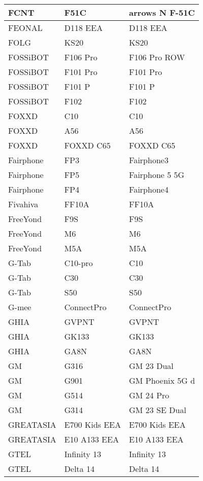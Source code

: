 \begin{tabularx}{\linewidth}{|l|X|X|}
        FCNT & F51C & arrows N F-51C \\ \hline
        FEONAL & D118 EEA & D118 EEA \\ \hline
        FOLG & KS20 & KS20 \\ \hline
        FOSSiBOT & F106 Pro & F106 Pro ROW \\ \hline
        FOSSiBOT & F101 Pro & F101 Pro \\ \hline
        FOSSiBOT & F101 P & F101 P \\ \hline
        FOSSiBOT & F102 & F102 \\ \hline
        FOXXD & C10 & C10 \\ \hline
        FOXXD & A56 & A56 \\ \hline
        FOXXD & FOXXD C65 & FOXXD C65 \\ \hline
        Fairphone & FP3 & Fairphone3 \\ \hline
        Fairphone & FP5 & Fairphone 5 5G \\ \hline
        Fairphone & FP4 & Fairphone4 \\ \hline
        Fivahiva & FF10A & FF10A \\ \hline
        FreeYond & F9S & F9S \\ \hline
        FreeYond & M6 & M6 \\ \hline
        FreeYond & M5A & M5A \\ \hline
        G-Tab & C10-pro & C10 \\ \hline
        G-Tab & C30 & C30 \\ \hline
        G-Tab & S50 & S50 \\ \hline
        G-mee & ConnectPro & ConnectPro \\ \hline
        GHIA & GVPNT & GVPNT \\ \hline
        GHIA & GK133 & GK133 \\ \hline
        GHIA & GA8N & GA8N \\ \hline
        GM & G316 & GM 23 Dual \\ \hline
        GM & G901 & GM Phoenix 5G d \\ \hline
        GM & G514 & GM 24 Pro \\ \hline
        GM & G314 & GM 23 SE Dual \\ \hline
        GREATASIA & E700 Kids EEA & E700 Kids EEA \\ \hline
        GREATASIA & E10 A133 EEA & E10 A133 EEA \\ \hline
        GTEL & Infinity 13 & Infinity 13 \\ \hline
        GTEL & Delta 14 & Delta 14 \\ \hline

\end{tabularx}
